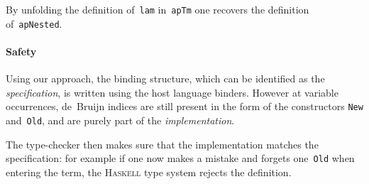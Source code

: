 \documentclass[9pt,preprint,authoryear]{sigplanconf}
\begin{document}
%
By unfolding the definition of{~}\textcolor[rgb]{0,0,0.80}{\texttt{lam}} in{~}\textcolor[rgb]{0,0,0.80}{\texttt{apTm\makebox[1.22ex][c]{\_{}}}} one recovers
    the definition of{~}\textcolor[rgb]{0,0,0.80}{\texttt{apNested}}.%


\paragraph*{Safety}

%
Using our approach, the binding structure, which can be identified as
    the \emph{specification}, is written using the host language binders.
    However at variable occurrences, de{~}Bruijn indices are still present
    in the form of the constructors \textcolor[rgb]{0.70,0.13,0.13}{\texttt{New}} and{~}\textcolor[rgb]{0.70,0.13,0.13}{\texttt{Old}}, and are
    purely part of the \emph{implementation}.%


%
The type-checker then makes sure that the implementation matches the specification{:}
    for example if one now makes a mistake and forgets one{~}\textcolor[rgb]{0.70,0.13,0.13}{\texttt{Old}} when entering the
    term, the \textsc{Haskell} type system rejects the definition.%


%
%


{\nopagebreak }
\end{document}
